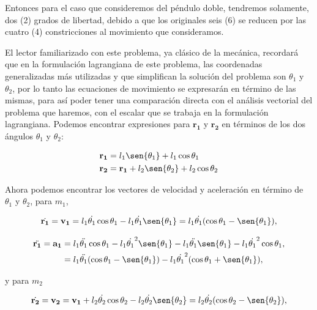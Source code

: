 \documentclass[a4paper,10pt]{article}
\numberwithin{equation}{section}
\begin{document}
Entonces para el caso que consideremos del péndulo doble, tendremos solamente, dos (2)
grados de libertad, debido a que los originales seis (6) se reducen por las cuatro (4)
constricciones al movimiento que consideramos. 

\vspace{.3cm}

El lector familiarizado con este problema, ya clásico de la mecánica, recordará que en 
la formulación lagrangiana de este problema, las coordenadas generalizadas más utilizadas
y que simplifican la solución del problema son $\theta_1$ y $\theta_2$, por lo tanto
las ecuaciones de movimiento se expresarán en término de las mismas, para así poder tener 
una comparación directa con el análisis vectorial del problema que haremos, con el escalar
que se trabaja en la formulación lagrangiana. Podemos encontrar expresiones para $\mathbf{r_1}$ y $\mathbf{r_2}$ en términos 
de los dos ángulos $\theta_1$ y $\theta_2$:

\begin{align}
 \mathbf{r_1} &= l_1\sen{\theta_1} + l_1\cos{\theta_1} \\
 \mathbf{r_2} &= \mathbf{r_1} +  l_2\sen{\theta_2} + l_2\cos{\theta_2}
 \label{eq:pendu2}
\end{align}

Ahora podemos encontrar los vectores de velocidad y aceleración en término de $\theta_1$ y $\theta_2$,
para $m_1$,

\begin{equation}
 \dot{\mathbf{r_1}} = \mathbf{v_1} = l_1 \dot{\theta_1} \cos{\theta_1} - l_1 \dot{\theta_1} \sen{\theta_1} = l_1 \dot{\theta_1}(\cos{\theta_1} - \sen{\theta_1}),
 \label{eq:pendu3}
\end{equation}

\begin{align}
\begin{split}
 \ddot{\mathbf{r_1}} = \mathbf{a_1} &= l_1 \ddot{\theta_1} \cos{\theta_1} - l_1 \dot{\theta_1}^2 \sen{\theta_1} - l_1 \ddot{\theta_1} \sen{\theta_1} - l_1 \dot{\theta_1}^2 \cos{\theta_1}, \\
 &=  l_1 \ddot{\theta_1} (\cos{\theta_1} - \sen{\theta_1}) - l_1 \dot{\theta_1}^2 (\cos{\theta_1} +  \sen{\theta_1}),
 \label{eq:pendu4}
\end{split}
\end{align}

y para $m_2$

\begin{equation}
 \dot{\mathbf{r_2}} = \mathbf{v_2} = \mathbf{v_1} + l_2 \dot{\theta_2} \cos{\theta_2} - l_2 \dot{\theta_2} \sen{\theta_2} = l_2 \dot{\theta_2}(\cos{\theta_2} - \sen{\theta_2}),
 \label{eq:pendu5}
\end{equation}
\end{document}
